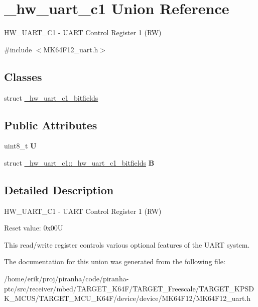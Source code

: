 \hypertarget{union__hw__uart__c1}{}\section{\+\_\+hw\+\_\+uart\+\_\+c1 Union Reference}
\label{union__hw__uart__c1}


H\+W\+\_\+\+U\+A\+R\+T\+\_\+\+C1 -\/ U\+A\+RT Control Register 1 (RW)  




{\ttfamily \#include $<$M\+K64\+F12\+\_\+uart.\+h$>$}

\subsection*{Classes}
\begin{DoxyCompactItemize}
\item 
struct \hyperlink{struct__hw__uart__c1_1_1__hw__uart__c1__bitfields}{\+\_\+hw\+\_\+uart\+\_\+c1\+\_\+bitfields}
\end{DoxyCompactItemize}
\subsection*{Public Attributes}
\begin{DoxyCompactItemize}
\item 
uint8\+\_\+t {\bfseries U}\hypertarget{union__hw__uart__c1_a7f74239ea33de80cd8d1493a642abf41}{}\label{union__hw__uart__c1_a7f74239ea33de80cd8d1493a642abf41}

\item 
struct \hyperlink{struct__hw__uart__c1_1_1__hw__uart__c1__bitfields}{\+\_\+hw\+\_\+uart\+\_\+c1\+::\+\_\+hw\+\_\+uart\+\_\+c1\+\_\+bitfields} {\bfseries B}\hypertarget{union__hw__uart__c1_ab1fa7cc0f3a3b189fb0917eadce98796}{}\label{union__hw__uart__c1_ab1fa7cc0f3a3b189fb0917eadce98796}

\end{DoxyCompactItemize}


\subsection{Detailed Description}
H\+W\+\_\+\+U\+A\+R\+T\+\_\+\+C1 -\/ U\+A\+RT Control Register 1 (RW) 

Reset value\+: 0x00U

This read/write register controls various optional features of the U\+A\+RT system. 

The documentation for this union was generated from the following file\+:\begin{DoxyCompactItemize}
\item 
/home/erik/proj/piranha/code/piranha-\/ptc/src/receiver/mbed/\+T\+A\+R\+G\+E\+T\+\_\+\+K64\+F/\+T\+A\+R\+G\+E\+T\+\_\+\+Freescale/\+T\+A\+R\+G\+E\+T\+\_\+\+K\+P\+S\+D\+K\+\_\+\+M\+C\+U\+S/\+T\+A\+R\+G\+E\+T\+\_\+\+M\+C\+U\+\_\+\+K64\+F/device/device/\+M\+K64\+F12/M\+K64\+F12\+\_\+uart.\+h\end{DoxyCompactItemize}
